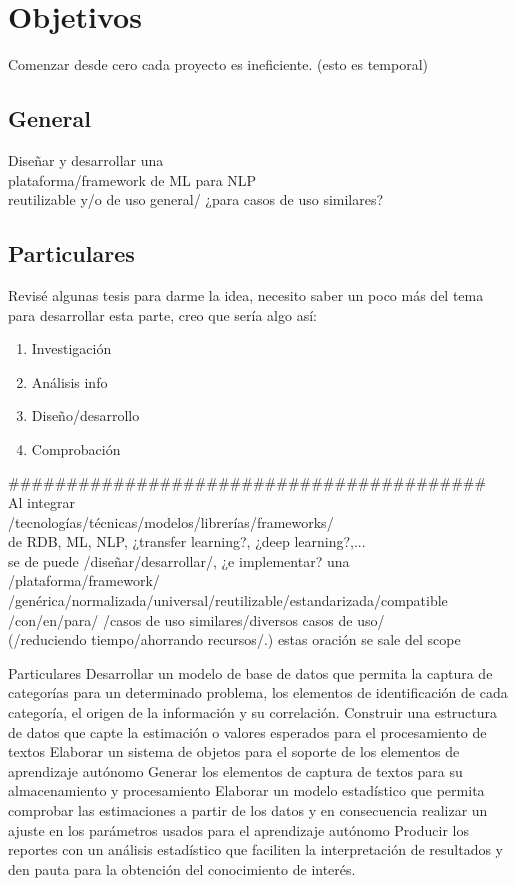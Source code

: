 \section {Objetivos}\label{sec:objetivos}
Comenzar desde cero cada proyecto es ineficiente. (esto es temporal)
\subsection {General}
Diseñar y desarrollar una\\
plataforma/framework de ML para NLP\\
reutilizable y/o de uso general/ ¿para casos de uso similares?
\subsection {Particulares}
Revisé algunas tesis para darme la idea, necesito saber un poco más del tema para desarrollar esta parte, creo que sería algo así:
\begin{enumerate}
    \item Investigación
    \item Análisis info
    \item Diseño/desarrollo
    \item Comprobación
\end{enumerate}

\#\#\#\#\#\#\#\#\#\#\#\#\#\#\#\#\#\#\#\#\#\#\#\#\#\#\#\#\#\#\#\#\#\#\#\#\#\#\#\#\#\\

Al integrar\\
/tecnologías/técnicas/modelos/librerías/frameworks/\\
de RDB, ML, NLP, ¿transfer learning?, ¿deep learning?,...\\
se de puede /diseñar/desarrollar/, ¿e implementar? una\\
/plataforma/framework/\\
/genérica/normalizada/universal/reutilizable/estandarizada/compatible\\
/con/en/para/ /casos de uso similares/diversos casos de uso/\\
(/reduciendo tiempo/ahorrando recursos/.) estas oración se sale del scope


Particulares
Desarrollar un modelo de base de datos que permita la captura de categorías para un determinado problema, los elementos de identificación de cada categoría, el origen de la información y su correlación.
Construir una estructura de datos que capte la estimación o valores esperados para el procesamiento de textos
Elaborar un sistema de objetos para el soporte de los elementos de aprendizaje autónomo
Generar los elementos de captura de textos para su almacenamiento y procesamiento
Elaborar un modelo estadístico que permita comprobar las estimaciones a partir de los datos y en consecuencia realizar un ajuste en los parámetros usados para el aprendizaje autónomo
Producir los reportes con un análisis estadístico que faciliten la interpretación de resultados y den pauta para la obtención del conocimiento de interés.
